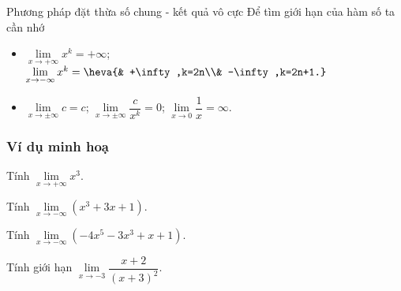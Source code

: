\begin{dang}{Phương pháp đặt thừa số chung - kết quả vô cực}
	Để tìm giới hạn của hàm số ta cần nhớ
	\begin{itemize}
		\item $\lim\limits_{x\to +\infty} x^k=+\infty$; $\lim\limits_{x\to -\infty} x^k=\heva{& +\infty,k=2n\\& -\infty,k=2n+1.}$
		\item $\lim\limits_{x\to \pm \infty}c=c$; $\lim\limits_{x\to \pm \infty} \dfrac {c}{x^k}=0$; $\lim\limits_{x\to 0} \dfrac {1}{x}=\infty$.
	\end{itemize}
\end{dang}
\subsubsection{Ví dụ minh hoạ}
\begin{vd}%
	Tính $\lim\limits_{x\to +\infty} x^3$.
\end{vd}
\begin{vd}%
	Tính $\lim\limits_{x\to -\infty }\left(x^3+3x+1\right)$.
	\dapso{$-\infty$}
\end{vd}
\begin{vd}%
	Tính $\lim\limits_{x\to -\infty}\left(-4x^5-3x^3+x+1\right)$.
\end{vd}
\begin{vd}%
	Tính giới hạn $\lim\limits_{x\to -3} \dfrac {x+2}{(x+3)^2}$. 
\end{vd}
